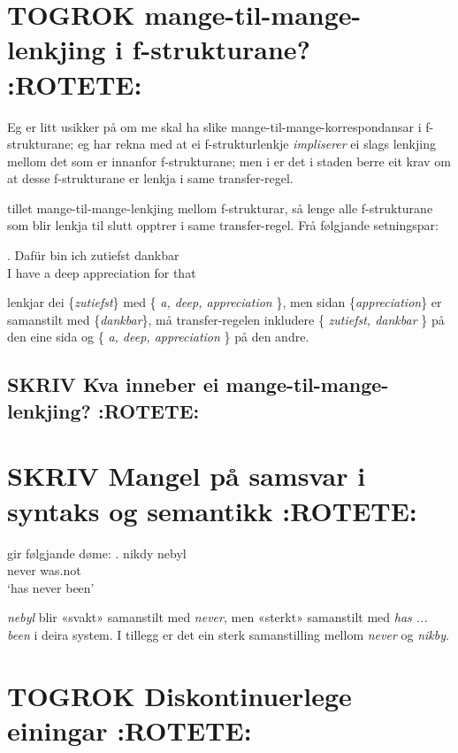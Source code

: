 \documentclass[11pt,a4paper,oneside,draft]{book}
\begin{document}
\section{\textbf{TOGROK} mange-til-mange-lenkjing i f-strukturane? \textbf{:ROTETE:}}
\label{sec-3.10}

    Eg er litt usikker på om me skal ha slike
    mange-til-mange-korrespondansar i f-strukturane; eg har rekna med
    at ei f-strukturlenkje \emph{impliserer} ei slags lenkjing mellom det som
    er innanfor f-strukturane; men i \citet{riezler2006gmt} er det i
    staden berre eit krav om at desse f-strukturane er lenkja i same
    transfer-regel.


\citet[s.~40--41]{riezler2006gmt} tillet mange-til-mange-lenkjing
mellom f-strukturar, så lenge alle f-strukturane som blir lenkja til
slutt opptrer i same transfer-regel. Frå følgjande setningspar:

\ex. Dafür bin ich zutiefst dankbar \\
     I have a deep appreciation for that

lenkjar dei \{\emph{zutiefst}\} med \{ \emph{a, deep, appreciation} \}, men
sidan \{\emph{appreciation}\} er samanstilt med \{\emph{dankbar}\}, må
transfer-regelen inkludere \{ \emph{zutiefst, dankbar} \} på den eine sida
og \{ \emph{a, deep, appreciation} \} på den andre.


\subsection{\textbf{SKRIV} Kva inneber ei mange-til-mange-lenkjing? \textbf{:ROTETE:}}
\label{sec-3.10.1}


\section{\textbf{SKRIV} Mangel på samsvar i syntaks og semantikk \textbf{:ROTETE:}}
\label{sec-3.11}

\cite[s.~5]{kruijffkorbayova2006agc} gir følgjande døme: 
\ex.  nikdy nebyl \\
      never was.not\\
      `has never been'

\emph{nebyl} blir «svakt» samanstilt med \emph{never}, men «sterkt» samanstilt med
\emph{has ... been} i deira system. I tillegg er det ein sterk samanstilling
mellom \emph{never} og \emph{nikby}.


\section{\textbf{TOGROK} Diskontinuerlege einingar \textbf{:ROTETE:}}
\label{sec-3.12}
\end{document}
